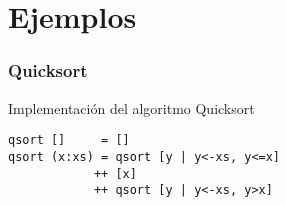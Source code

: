 \section{Ejemplos}

\begin{frame}[fragile]
  \frametitle{Quicksort}
  Implementación del algoritmo Quicksort
\begin{lstlisting}
qsort []     = []
qsort (x:xs) = qsort [y | y<-xs, y<=x] 
            ++ [x]
            ++ qsort [y | y<-xs, y>x]
\end{lstlisting}
\end{frame}